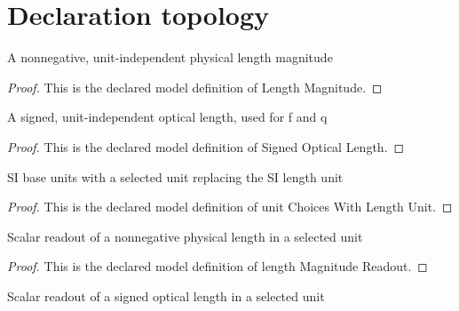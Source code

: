 \section{Declaration topology}
\begin{definition}
  \label{def:physics:phyx-mini-0478:phyxminiproblems-problemphyxmini0478-lengthmagnitude}
  A nonnegative, unit-independent physical length magnitude
\end{definition}
\begin{proof}
  This is the declared model definition of Length Magnitude.
\end{proof}
\begin{definition}
  \label{def:physics:phyx-mini-0478:phyxminiproblems-problemphyxmini0478-signedopticallength}
  A signed, unit-independent optical length, used for f and q
\end{definition}
\begin{proof}
  This is the declared model definition of Signed Optical Length.
\end{proof}
\begin{definition}
  \label{def:physics:phyx-mini-0478:phyxminiproblems-problemphyxmini0478-unitchoiceswithlengthunit}
  SI base units with a selected unit replacing the SI length unit
\end{definition}
\begin{proof}
  This is the declared model definition of unit Choices With Length Unit.
\end{proof}
\begin{definition}
  \label{def:physics:phyx-mini-0478:phyxminiproblems-problemphyxmini0478-lengthmagnitudereadout}
  Scalar readout of a nonnegative physical length in a selected unit
\end{definition}
\begin{proof}
  This is the declared model definition of length Magnitude Readout.
\end{proof}
\begin{definition}
  \label{def:physics:phyx-mini-0478:phyxminiproblems-problemphyxmini0478-signedlengthreadout}
  Scalar readout of a signed optical length in a selected unit
\end{definition}
